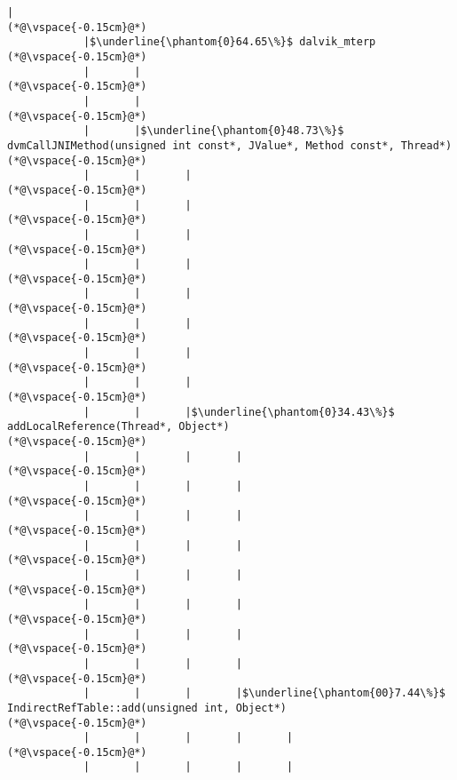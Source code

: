\begin{lstlisting}[caption=20 viiteparametria Java$\to$C , label=profile:J2CBenchmark00206, numberbychapter=true, frame=lines, float, floatplacement=t]
            |
(*@\vspace{-0.15cm}@*)
            |$\underline{\phantom{0}64.65\%}$ dalvik_mterp
(*@\vspace{-0.15cm}@*)
            |       |
(*@\vspace{-0.15cm}@*)
            |       |
(*@\vspace{-0.15cm}@*)
            |       |$\underline{\phantom{0}48.73\%}$ dvmCallJNIMethod(unsigned int const*, JValue*, Method const*, Thread*)
(*@\vspace{-0.15cm}@*)
            |       |       |
(*@\vspace{-0.15cm}@*)
            |       |       |
(*@\vspace{-0.15cm}@*)
            |       |       |
(*@\vspace{-0.15cm}@*)
            |       |       |
(*@\vspace{-0.15cm}@*)
            |       |       |
(*@\vspace{-0.15cm}@*)
            |       |       |
(*@\vspace{-0.15cm}@*)
            |       |       |
(*@\vspace{-0.15cm}@*)
            |       |       |
(*@\vspace{-0.15cm}@*)
            |       |       |$\underline{\phantom{0}34.43\%}$ addLocalReference(Thread*, Object*)
(*@\vspace{-0.15cm}@*)
            |       |       |       |
(*@\vspace{-0.15cm}@*)
            |       |       |       |
(*@\vspace{-0.15cm}@*)
            |       |       |       |
(*@\vspace{-0.15cm}@*)
            |       |       |       |
(*@\vspace{-0.15cm}@*)
            |       |       |       |
(*@\vspace{-0.15cm}@*)
            |       |       |       |
(*@\vspace{-0.15cm}@*)
            |       |       |       |
(*@\vspace{-0.15cm}@*)
            |       |       |       |
(*@\vspace{-0.15cm}@*)
            |       |       |       |$\underline{\phantom{00}7.44\%}$ IndirectRefTable::add(unsigned int, Object*)
(*@\vspace{-0.15cm}@*)
            |       |       |       |       |
(*@\vspace{-0.15cm}@*)
            |       |       |       |       |

\end{lstlisting}
